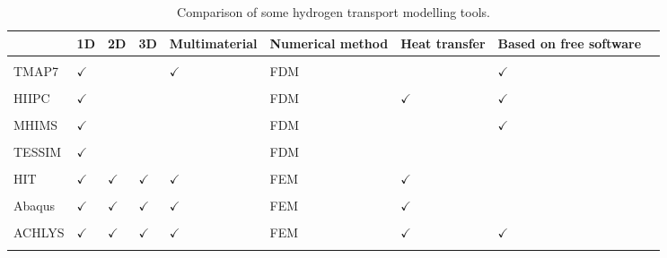 \begin{table} [h]
    \centering
    \begin{tabular}{L{2cm} L{0.5cm} L{0.5cm} L{0.5cm} L{1.7cm} l l l l}
              & 1D & 2D & 3D & Multimaterial & Numerical method & Heat transfer & Based on free software \\
        \hline \\
        TMAP7 \cite{longhurst_tmap7_2008} & $\checkmark$ & & & $\checkmark$ & FDM & & $\checkmark$ \\
        \\
        HIIPC \cite{sang_modelling_2012} & $\checkmark$ & & & & FDM & $\checkmark$ & $\checkmark$ \\
        \\
        MHIMS \cite{hodille_study_2016} & $\checkmark$ & & & & FDM & & $\checkmark$ \\
        \\
        TESSIM \cite{schmid_transport_2014} & $\checkmark$ & & & & FDM & & \\
        \\
        HIT \cite{candido_integrated_2020} & $\checkmark$ & $\checkmark$ & $\checkmark$ & $\checkmark$ & FEM & $\checkmark$ & \\
        \\
        Abaqus \cite{benannoune_multidimensional_2020} & $\checkmark$ & $\checkmark$ & $\checkmark$ & $\checkmark$ & FEM & $\checkmark$ & \\
        \\
        ACHLYS \cite{stephen-dixon_aurora-multiphysicsachlys_2021} & $\checkmark$ & $\checkmark$ & $\checkmark$ & $\checkmark$ & FEM & $\checkmark$ & $\checkmark$ \\
        \\
    \end{tabular}
    \caption{Comparison of some hydrogen transport modelling tools.}
    \label{tab: code comparison}
\end{table}

